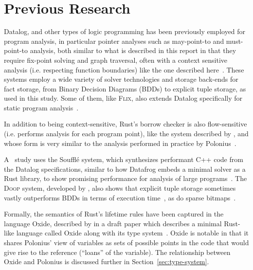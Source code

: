 \documentclass[11pt,a4paper,twoside,openany,draft]{report}
\begin{document}
\section{Previous Research}
Datalog, and other types of logic programming has been previously employed for
program analysis, in particular pointer analyses such as may-point-to and
must-point-to analysis, both similar to what is described in this report in that
they require fix-point solving and graph traversal, often with a context
sensitive analysis (i.e. respecting function boundaries) like the
one described here~\cite{Dawson:1996:PPA:231379.231399,
  Berndl:2003:PAU:780822.781144, hajiyev_codequest:_2005,
  Whaley:2004:CCP:996893.996859, lam_context-sensitive_2005,
  Benton:2007:ISD:1273920.1273923, Hardekopf:2007:AGF:1250734.1250767,
  Smaragdakis:2011:PYC:1926385.1926390, smaragdakis_using_2010,
  balatsouras_datalog_2017, Madsen:2016:DFD:2908080.2908096,
  Eichberg:2008:DCC:1368088.1368142}. These systems employ a wide variety of
solver technologies and storage back-ends for fact storage, from Binary
Decision Diagrams (BDDs) to explicit tuple storage, as used in this study. Some
of them, like \textsc{Flix}, also extends Datalog specifically for static
program analysis~\cite{Madsen:2016:DFD:2908080.2908096}.

In addition to being context-sensitive, Rust's borrow checker is also
flow-sensitive (i.e. performs analysis for each program point), like the system
described by \citeauthor*{Hardekopf:2009:SFP:1480881.1480911}, and whose form is
very similar to the analysis performed in practice by
Polonius~\cite{Hardekopf:2009:SFP:1480881.1480911}.

A \citeyear{scholz_fast_2016}~study uses the Souffl{\'e} system, which
synthesizes performant C++ code from the Datalog specifications, similar to how
Datafrog embeds a minimal solver as a Rust library, to show promising
performance for analysis of large programs~\cite{scholz_fast_2016}. The
\textsc{Doop} system, developed by \citeauthor*{smaragdakis_using_2010}, also
shows that explicit tuple storage sometimes vastly outperforms BDDs in terms of
execution time~\cite{smaragdakis_using_2010}, as do sparse
bitmaps~\cite{Hardekopf:2007:AGF:1250734.1250767}.

Formally, the semantics of Rust's lifetime rules have been captured in the
language Oxide, described by \citeauthor*{weiss_oxide:_2019} in a draft paper
which describes a minimal Rust-like language called Oxide along with its type
system~\cite{weiss_oxide:_2019}. Oxide is notable in that it shares Polonius'
view of variables as sets of possible points in the code that would give rise to
the reference (``loans'' of the variable). The relationship between Oxide and
Polonius is discussed further in Section~\ref{sec:type-system}.
\end{document}
